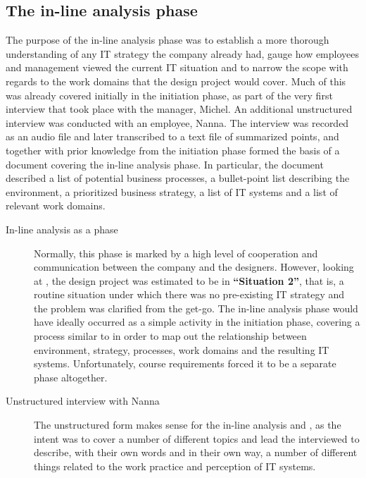 \subsection{The in-line analysis phase}
The purpose of the in-line analysis phase was to establish a more thorough
understanding of any IT strategy the company already had, gauge how \gomonkey{}
employees and management viewed the current IT situation and to narrow the scope
with regards to the work domains that the design project would cover. Much of
this was already covered initially in the initiation phase, as part of the very
first interview that took place with the manager, Michel. An additional
unstructured interview was conducted with an employee, Nanna. The interview was
recorded as an audio file and later transcribed to a text file of summarized
points, and together with prior knowledge from the initiation phase formed the
basis of a document covering the in-line analysis phase. In particular, the
document described a list of potential business processes, a bullet-point list
describing the environment, a prioritized business strategy, a list of IT
systems and a list of relevant work domains. 

\begin{description}
    \item [In-line analysis as a phase] Normally, this phase is marked by a
        high level of cooperation and communication between the company and the
        designers\cite{bodker2004participatory}. However, looking at
        \cite[p.120, Figure 5.1]{bodker2004participatory}, the \gomonkey{}
        design project was estimated to be in \textbf{``Situation 2''}, that is,
        a routine situation under which there was no pre-existing IT strategy
        and the problem was clarified from the get-go. The in-line analysis
        phase would have ideally occurred as a simple activity in the initiation
        phase, covering a process similar to \cite[p.131, Figure
        5.3]{bodker2004participatory} in order to map out the relationship
        between environment, strategy, processes, work domains and the resulting
        IT systems. Unfortunately, course requirements forced it to be a separate phase
        altogether. 
    \item [Unstructured interview with Nanna] The unstructured form makes sense for the
        in-line analysis and \gomonkey{}, as the intent was to cover a number of
        different topics and lead the interviewed to describe, with their own
        words and in their own way, a number of different things related to the
        work practice and perception of IT systems.
\end{description}


